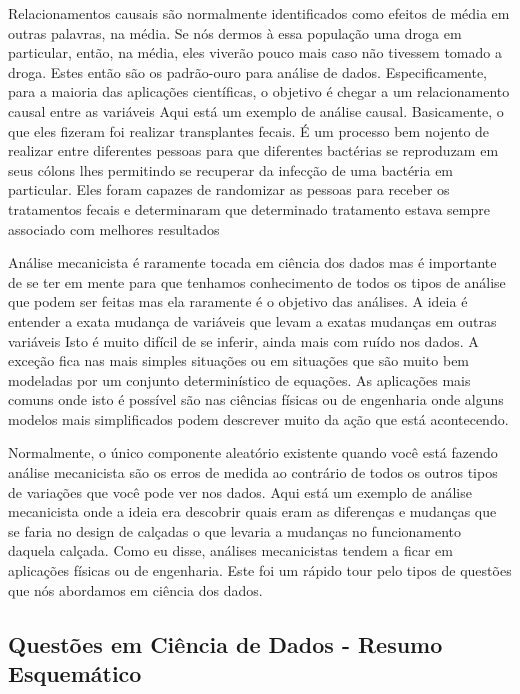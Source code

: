 Relacionamentos causais são normalmente identificados como efeitos de média em outras palavras, na média. Se nós dermos à essa população uma droga em particular, então, na média, eles viverão pouco mais caso não tivessem tomado a droga. Estes então são os padrão-ouro para análise de dados. Especificamente, para a maioria das aplicações científicas, o objetivo é chegar a um relacionamento causal entre as variáveis Aqui está um exemplo de análise causal. Basicamente, o que eles fizeram foi realizar transplantes fecais. É um processo bem nojento de realizar entre diferentes pessoas para que diferentes bactérias se reproduzam em seus cólons lhes permitindo se recuperar da infecção de uma bactéria em particular. Eles foram capazes de randomizar as pessoas para receber os tratamentos fecais e determinaram que determinado tratamento estava sempre associado com melhores resultados 

Análise mecanicista é raramente tocada em ciência dos dados mas é importante de se ter em mente para que tenhamos conhecimento de todos os tipos de análise que podem ser feitas mas ela raramente é o objetivo das análises. A ideia é entender a exata mudança de variáveis que levam a exatas mudanças em outras variáveis Isto é muito difícil de se inferir, ainda mais com ruído nos dados. A exceção fica nas mais simples situações ou em situações que são muito bem modeladas por um conjunto determinístico de equações. As aplicações mais comuns onde isto é possível são nas ciências físicas ou de engenharia onde alguns modelos mais simplificados podem descrever muito da ação que está acontecendo. 

Normalmente, o único componente aleatório existente quando você está fazendo análise mecanicista são os erros de medida ao contrário de todos os outros tipos de variações que você pode ver nos dados. Aqui está um exemplo de análise mecanicista onde a ideia era descobrir quais eram as diferenças e mudanças que se faria no design de calçadas o que levaria a mudanças no funcionamento daquela calçada. Como eu disse, análises mecanicistas tendem a ficar em aplicações físicas ou de engenharia. Este foi um rápido tour pelo tipos de questões que nós abordamos em ciência dos dados.


\subsection*{Questões em Ciência de Dados - Resumo Esquemático}

